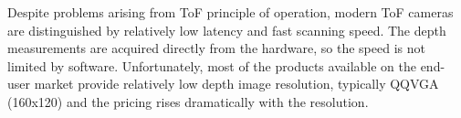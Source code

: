 Despite problems arising from ToF principle of operation, modern ToF cameras are distinguished by relatively low latency and fast scanning speed. The depth measurements are acquired directly from the hardware, so the speed is not limited by software. Unfortunately, most of the products available on the end-user market provide relatively low depth image resolution, typically QQVGA (160x120) and the pricing rises dramatically with the resolution.

